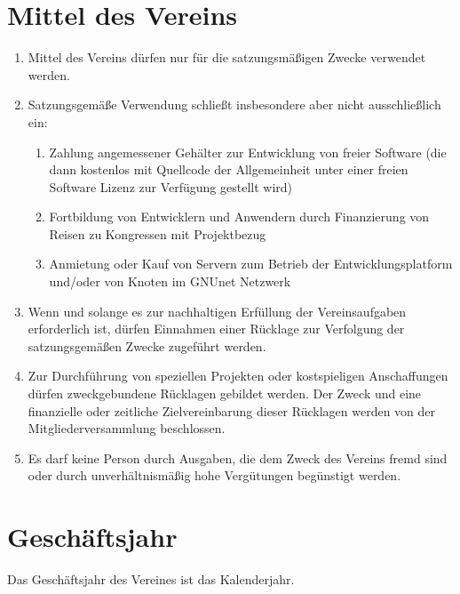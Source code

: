 \documentclass[german,a4paper]{article} %
\newenvironment{enumpar}{%
  \renewcommand{\labelenumi}{\theenumi}%
  \renewcommand{\theenumi}{(\arabic{enumi})}%
  \renewcommand{\labelenumii}{\theenumii}%
  \renewcommand{\theenumii}{(\alph{enumii})}%
  \begin{enumerate}}
{\end{enumerate}}
\begin{document}
\section{Mittel des Vereins}
\begin{enumpar}
\item Mittel des Vereins dürfen nur für die satzungsmäßigen Zwecke verwendet werden.
\item Satzungsgemäße Verwendung schließt insbesondere aber nicht ausschließlich ein:
\begin{enumpar}
\item Zahlung angemessener Geh\"alter zur Entwicklung von freier Software (die dann kostenlos mit Quellcode
      der Allgemeinheit unter einer freien Software Lizenz zur Verf\"ugung gestellt wird)
\item Fortbildung von Entwicklern und Anwendern durch Finanzierung von Reisen zu Kongressen mit Projektbezug
\item Anmietung oder Kauf von Servern zum Betrieb der Entwicklungsplatform und/oder von Knoten im GNUnet Netzwerk
\end{enumpar}
\item Wenn und solange es zur nachhaltigen Erfüllung der Vereinsaufgaben erforderlich ist, dürfen Einnahmen einer Rücklage zur Verfolgung der satzungsgemäßen Zwecke zugeführt werden.
\item Zur Durchführung von speziellen Projekten oder kostspieligen Anschaffungen dürfen zweckgebundene Rücklagen gebildet werden. Der Zweck und eine finanzielle oder zeitliche Zielvereinbarung dieser Rücklagen werden von der Mitgliederversammlung beschlossen.
\item Es darf keine Person durch Ausgaben, die dem Zweck des Vereins fremd sind oder durch unverhältnismäßig hohe Vergütungen begünstigt werden.
\end{enumpar}

\section{Geschäftsjahr}
Das Geschäftsjahr des Vereines ist das Kalenderjahr.
\end{document}
